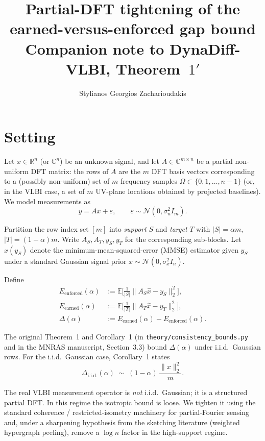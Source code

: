 \documentclass[11pt]{article}
\title{Partial-DFT tightening of the earned-versus-enforced gap bound \\
  \large Companion note to DynaDiff-VLBI, Theorem~$1'$}
\author{Stylianos Georgios Zacharioudakis}
\date{}
\theoremstyle{remark}
\begin{document}
\maketitle

\section*{Setting}

Let $x \in \mathbb{R}^n$ (or $\mathbb{C}^n$) be an unknown signal, and let
$A \in \mathbb{C}^{m \times n}$ be a partial non-uniform DFT matrix: the
rows of $A$ are the $m$ DFT basis vectors corresponding to a (possibly
non-uniform) set of $m$ frequency samples $\Omega \subset \{0,1,\ldots,n-1\}$
(or, in the VLBI case, a set of $m$ UV-plane locations obtained by
projected baselines). We model measurements as
\begin{equation}
    y = A x + \varepsilon, \qquad
    \varepsilon \sim \mathcal{N}(0, \sigma_n^2 I_m).
\end{equation}

Partition the row index set $[m]$ into \emph{support} $S$ and
\emph{target} $T$ with $|S| = \alpha m$, $|T| = (1-\alpha)m$. Write
$A_S, A_T, y_S, y_T$ for the corresponding sub-blocks. Let
$\hat{x}(y_S)$ denote the minimum-mean-squared-error (MMSE) estimator
given $y_S$ under a standard Gaussian signal prior
$x \sim \mathcal{N}(0, \sigma_x^2 I_n)$.

Define
\begin{align*}
    E_{\mathrm{enforced}}(\alpha) &:= \mathbb{E}\big[\tfrac{1}{|S|}\|A_S \hat{x} - y_S\|_2^2\big], \\
    E_{\mathrm{earned}}(\alpha)   &:= \mathbb{E}\big[\tfrac{1}{|T|}\|A_T \hat{x} - y_T\|_2^2\big], \\
    \Delta(\alpha) &:= E_{\mathrm{earned}}(\alpha) - E_{\mathrm{enforced}}(\alpha).
\end{align*}

The original Theorem~1 and Corollary~1 (in
\texttt{theory/consistency\_bounds.py} and in the MNRAS manuscript,
Section~3.3) bound $\Delta(\alpha)$ under i.i.d.\ Gaussian rows. For the
i.i.d.\ Gaussian case, Corollary~1 states
\begin{equation}
    \Delta_{\mathrm{i.i.d.}}(\alpha) \;\sim\; (1-\alpha)\, \frac{\|x\|_2^2}{m}. \tag{Corollary 1}
\end{equation}

The real VLBI measurement operator is \emph{not} i.i.d.\ Gaussian; it is a
structured partial DFT. In this regime the isotropic bound is loose. We
tighten it using the standard coherence / restricted-isometry machinery
for partial-Fourier sensing and, under a sharpening hypothesis from the
sketching literature (weighted hypergraph peeling), remove a $\log n$
factor in the high-support regime.
\end{document}
